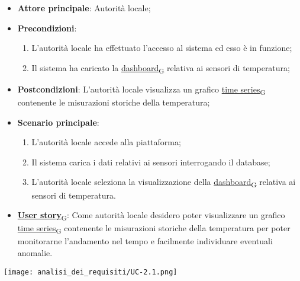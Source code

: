 \begin{itemize}
	\item \textbf{Attore principale}: Autorità locale;
	\item \textbf{Precondizioni}:
	      \begin{enumerate}
		      \item L'autorità locale ha effettuato l'accesso al sistema ed esso è in funzione;
		      \item Il sistema ha caricato la \href{https://7last.github.io/docs/rtb/documentazione-interna/glossario\#dashboard}{dashboard\textsubscript{G}} relativa ai sensori di temperatura;
	      \end{enumerate}
	\item \textbf{Postcondizioni}: L'autorità locale visualizza un grafico \href{https://7last.github.io/docs/rtb/documentazione-interna/glossario\#time-series}{time series\textsubscript{G}} contenente le misurazioni storiche
	      della temperatura;
	\item \textbf{Scenario principale}:
	      \begin{enumerate}
		      \item L'autorità locale accede alla piattaforma;
		      \item Il sistema carica i dati relativi ai sensori interrogando il database;
		      \item L'autorità locale seleziona la visualizzazione della \href{https://7last.github.io/docs/rtb/documentazione-interna/glossario\#dashboard}{dashboard\textsubscript{G}} relativa ai sensori di temperatura.
	      \end{enumerate}
	\item \href{https://7last.github.io/docs/rtb/documentazione-interna/glossario\#user-story}{\textbf{User story}\textsubscript{G}}: Come autorità locale desidero poter visualizzare un grafico \href{https://7last.github.io/docs/rtb/documentazione-interna/glossario\#time-series}{time series\textsubscript{G}} contenente le misurazioni storiche della temperatura
	      per poter monitorarne l'andamento nel tempo e facilmente individuare eventuali anomalie.
\end{itemize}
\begin{center}
	\texttt{[image: analisi\_dei\_requisiti/UC-2.1.png]}
\end{center}

